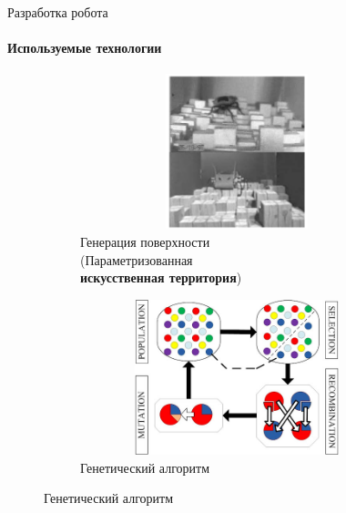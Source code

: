 \documentclass[aspectratio=169,xcolor=table,10pt]{beamer}
\begin{document}
\begin{frame}[c]{Разработка робота}
    \framesubtitle{Используемые технологии}
    \vspace{-0.7cm}
    \begin{figure}[H]
        \begin{subfigure}[t]{0.45\textwidth}
            \centering\includegraphics[height=4.5cm,width=1\textwidth,keepaspectratio]{c1_paper.png}
            \caption*{\small Генерация поверхности \\ (Параметризованная \\ \textbf{искусственная территория})}
        \end{subfigure}
        \begin{subfigure}[t]{0.45\textwidth}
            \centering\includegraphics[height=4.5cm,width=1\textwidth,keepaspectratio]{gen_algo.jpg}
            \caption*{ \small Генетический алгоритм}
        \end{subfigure}
        \hfill
    \end{figure}
\end{frame}
\end{document}
